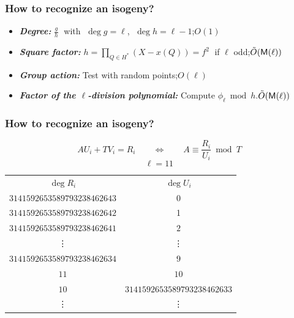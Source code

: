 \documentclass[10pt,usepdftitle=false]{beamer}
\begin{document}
\begin{frame}
  \frametitle{How to recognize an isogeny?}

  \begin{itemize}
    \setlength{\itemsep}{\baselineskip}
  \item \emph{\textbf{Degree:}} $\frac{g}{h}\;$ with $\;\deg g=\ell$, $\;\deg h = \ell-1$;\hfill\alert{$O(1)$}
  \item \emph{\textbf{Square factor:}} $h = \prod_{Q\in H^\ast}(X-
    x(Q)) = f^2\;$ if $\ell$ odd;\hfill\emph{$\tilde{O}(\mathsf{M}(\ell))$}
  \item \emph{\textbf{Group action:}} Test with random points;\hfill\emph{$O(\ell)$}
  \item \emph{\textbf{Factor of the $\ell$-division polynomial:}}
    Compute $\phi_\ell\bmod h$.\hfill\emph{$\tilde{O}(\mathsf{M}(\ell))$}
  \end{itemize}
\end{frame}


\begin{frame}
  \frametitle{How to recognize an isogeny?}
  
  \[AU_i + TV_i = R_i  \qquad\Leftrightarrow\qquad  A\equiv \frac{R_i}{U_i} \bmod T\]
  \[\ell = 11\]
  \pause
  \begin{center}
  \begin{tabular}{c | c}
    $\deg R_i$ & $\deg U_i$ \\
    $3141592653589793238462643$ & 0 \\
    \pause
    $3141592653589793238462642$ & 1 \\
    \pause
    $3141592653589793238462641$ & $2$ \\
    \pause
    \vdots & \vdots\\
    $3141592653589793238462634$ & $9$ \\
    \pause\pause
    \Huge\alert{$11$} & \Huge\alert{$10$}\\
    \pause
    $10$ & $3141592653589793238462633$\\
    \vdots & \vdots
  \end{tabular}
  \end{center}
\end{frame}

\end{document}
